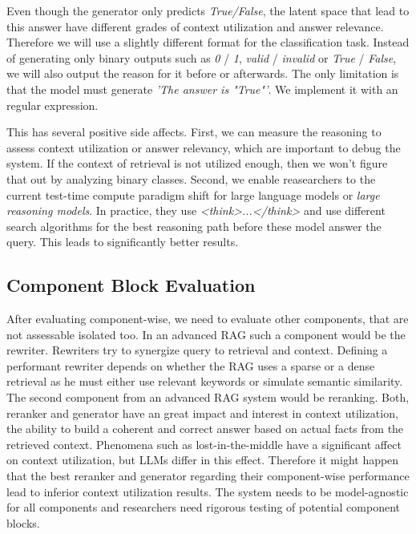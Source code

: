 Even though the generator only predicts \textit{True/False}, the latent space that lead to this answer have different grades of context utilization and answer relevance. Therefore we will use a slightly different format for the classification task. Instead of generating only binary outputs such as \textit{0} / \textit{1}, \textit{valid} / \textit{invalid} or \textit{True} / \textit{False}, we will also output the reason for it before or afterwards. The only limitation is that the model must generate \textit{'The answer is "True"'}. We implement it with an regular expression.

This has several positive side affects. First, we can measure the reasoning to assess context utilization or answer relevancy, which are important to debug the system. If the context of retrieval is not utilized enough, then we won't figure that out by analyzing binary classes. Second, we enable reasearchers to the current test-time compute paradigm shift for large language models or \textit{large reasoning models}. In practice, they use \textit{<think>...</think>} and use different search algorithms for the best reasoning path before these model answer the query. This leads to significantly better results.\cite{Xu.16.01.2025}


\subsection{Component Block Evaluation}

After evaluating component-wise, we need to evaluate other components, that are not assessable isolated too. In an advanced RAG such a component would be the rewriter. Rewriters try to synergize query to retrieval and context. Defining a performant rewriter depends on whether the RAG uses a sparse or a dense retrieval as he must either use relevant keywords or simulate semantic similarity. The second component from an advanced RAG system would be reranking. Both, reranker and generator have an great impact and interest in context utilization, the ability to build a coherent and correct answer based on actual facts from the retrieved context. Phenomena such as lost-in-the-middle have a significant affect on context utilization, but LLMs differ in this effect.\cite{Liu.06.07.2023} Therefore it might happen that the best reranker and generator regarding their component-wise performance lead to inferior context utilization results. The system needs to be model-agnostic for all components and researchers need rigorous testing of potential component blocks. 

